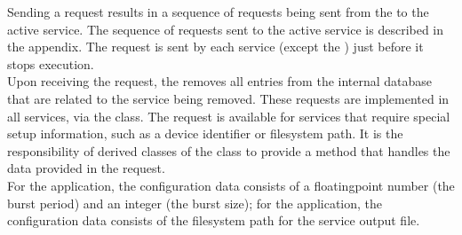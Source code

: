 Sending a  request results in a
sequence of requests being sent from the 
to the active service.
The sequence of requests sent to the active service is described in the 
 appendix.
The  request is sent by each
service (except the ) just before it stops
execution.\\

Upon receiving the  request,
the  removes all entries from the internal
database that are related to the service being removed.
\secondaryEnd{}
These requests are implemented in all \mplusm{}  services, via the
 class.
The  request is available for
 services that require special setup information, such as a device
identifier or file\longDash{}system path.
It is the responsibility of derived classes of the
 class to provide a method that handles the
data provided in the  request.\\

For the  application, the configuration
data consists of a floating\longDash{}point number (the burst period) and an integer (the
burst size); for the  application, the
configuration data consists of the file\longDash{}system path for the service output
file.\\

